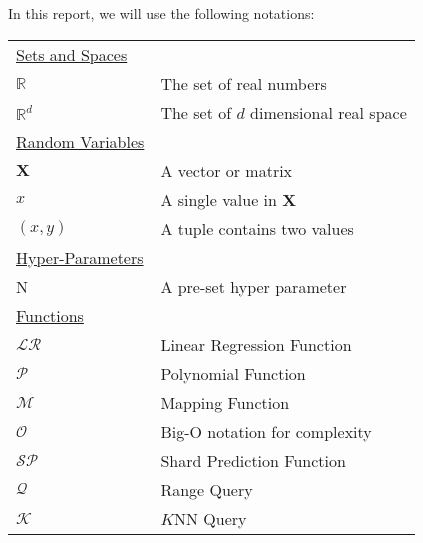 In this report, we will use the following notations:

\begin{table}[h]
\begin{tabularx}{\textwidth}{@{}XX@{}}
\toprule
  \underline{Sets and Spaces} \\
  $\mathbb{R}$ & The set of real numbers \\
  $\mathbb{R}^d$ & The set of $d$ dimensional real space \\
  \underline{Random Variables} \\
  $\boldsymbol{X}$ & A vector or matrix \\
  $x$ & A single value in $\textbf{X}$ \\
  $(x,y)$ & A tuple contains two values \\	
  \underline{Hyper-Parameters} \\
  N   & A pre-set hyper parameter \\
  \underline{Functions} \\
  $\mathcal{LR}$ & Linear Regression Function\\
  $\mathcal{P}$ & Polynomial Function\\
  $\mathcal{M}$ & Mapping Function\\
  $\mathcal{O}$ & Big-O notation for complexity\\
  $\mathcal{SP}$ & Shard Prediction Function\\
  $\mathcal{Q}$ & Range Query \\
  $\mathcal{K}$ & $K$NN Query \\
\bottomrule
\end{tabularx}
\end{table}
